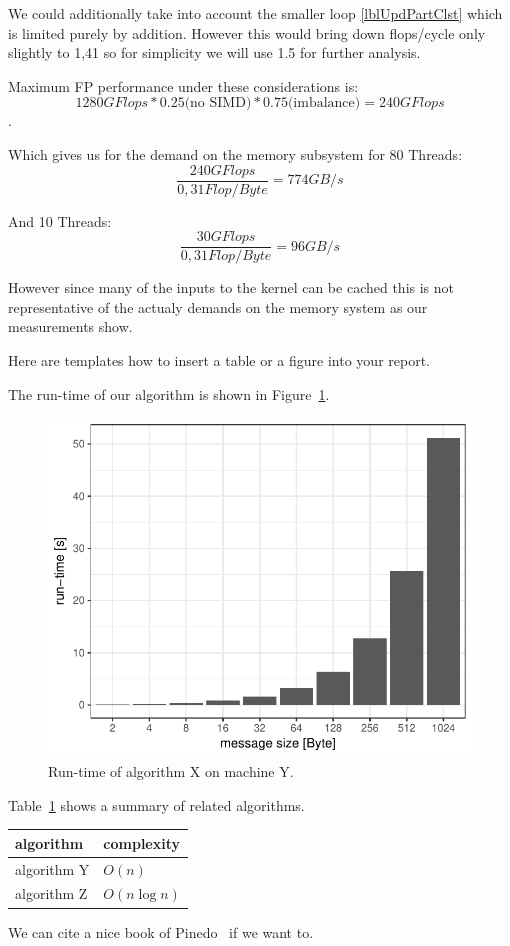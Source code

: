 We could additionally take into account the smaller loop \autoref{lblUpdPartClst} which is limited purely by addition.
However this would bring down flops/cycle only slightly to 1,41 so for simplicity we will use 1.5 for further analysis.

Maximum FP performance under these considerations is:
$$1280 GFlops * 0.25 \text{(no SIMD)}  * 0.75 \text{(imbalance)} = 240 GFlops$$.

Which gives us for the demand on the memory subsystem for 80 Threads:
$$\frac{240 GFlops}{0,31 Flop/Byte} = 774 GB/s$$

And 10 Threads:
$$\frac{30 GFlops}{0,31 Flop/Byte} = 96 GB/s$$

However since many of the inputs to the kernel can be cached this is not representative of the actualy demands on the memory system as our measurements show.

















\newpage

Here are templates how to insert a table or a figure into your report.

The run-time of our algorithm is shown in Figure~\ref{fig:runtime}.

\begin{figure}[ht]
\centering
\includegraphics[width=.5\linewidth]{figures/runtime}
\caption{Run-time of algorithm X on machine Y.}
\label{fig:runtime}
\end{figure}


Table~\ref{tab:related_algorithms} shows a summary of related algorithms.

\begin{table}[ht]
\centering
{}
\label{tab:related_algorithms}
\begin{tabular}{ll}
\toprule 
algorithm & complexity \\
\midrule
algorithm Y & $O(n)$ \\
algorithm Z & $O(n \log{n} )$ \\
\bottomrule
\end{tabular}
\end{table}

We can cite a nice book of Pinedo~\cite{Pinedo:2008vs} if we want to.
